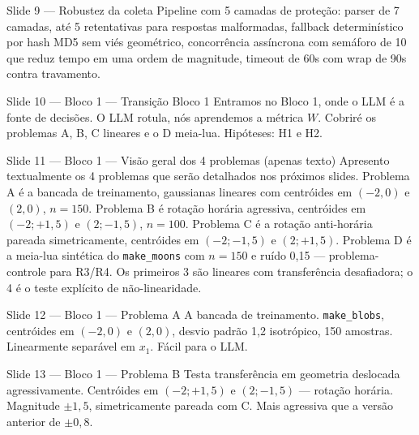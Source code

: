 \documentclass[aspectratio=169,10pt]{beamer}
\begin{document}
\begin{frame}{Slide 9 --- Robustez da coleta}
\footnotesize
Pipeline com 5 camadas de prote\c{c}\~ao: parser de 7 camadas, at\'e 5 retentativas para respostas malformadas, fallback determin\'istico por hash MD5 sem vi\'es geom\'etrico, concorr\^encia ass\'incrona com sem\'aforo de 10 que reduz tempo em uma ordem de magnitude, timeout de 60s com wrap de 90s contra travamento.
\end{frame}

\begin{frame}{Slide 10 --- Bloco 1 --- Transi\c{c}\~ao Bloco 1}
\footnotesize
Entramos no Bloco 1, onde o LLM \'e a fonte de decis\~oes. O LLM rotula, n\'os aprendemos a m\'etrica $W$. Cobrir\'e os problemas A, B, C lineares e o D meia-lua. Hip\'oteses: H1 e H2.
\end{frame}

\begin{frame}{Slide 11 --- Bloco 1 --- Vis\~ao geral dos 4 problemas (apenas texto)}
\footnotesize
Apresento textualmente os 4 problemas que ser\~ao detalhados nos pr\'oximos slides. Problema A \'e a bancada de treinamento, gaussianas lineares com centr\'oides em $(-2, 0)$ e $(2, 0)$, $n=150$. Problema B \'e rota\c{c}\~ao hor\'aria agressiva, centr\'oides em $(-2; +1{,}5)$ e $(2; -1{,}5)$, $n=100$. Problema C \'e a rota\c{c}\~ao anti-hor\'aria pareada simetricamente, centr\'oides em $(-2; -1{,}5)$ e $(2; +1{,}5)$. Problema D \'e a meia-lua sint\'etica do \texttt{make\_moons} com $n=150$ e ru\'ido 0{,}15 --- problema-controle para R3/R4. Os primeiros 3 s\~ao lineares com transfer\^encia desafiadora; o 4\textordmasculine{} \'e o teste expl\'icito de n\~ao-linearidade.
\end{frame}

\begin{frame}{Slide 12 --- Bloco 1 --- Problema A}
\footnotesize
A bancada de treinamento. \texttt{make\_blobs}, centr\'oides em $(-2, 0)$ e $(2, 0)$, desvio padr\~ao 1{,}2 isotr\'opico, 150 amostras. Linearmente separ\'avel em $x_1$. F\'acil para o LLM.
\end{frame}

\begin{frame}{Slide 13 --- Bloco 1 --- Problema B}
\footnotesize
Testa transfer\^encia em geometria deslocada agressivamente. Centr\'oides em $(-2; +1{,}5)$ e $(2; -1{,}5)$ --- rota\c{c}\~ao hor\'aria. Magnitude $\pm 1{,}5$, simetricamente pareada com C. Mais agressiva que a vers\~ao anterior de $\pm 0{,}8$.
\end{frame}
\end{document}
